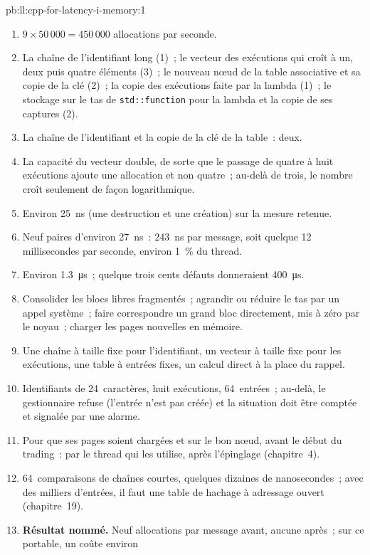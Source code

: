 \begin{solution}{pb:ll:cpp-for-latency-i-memory:1}
\begin{enumerate}
\item $9 \times 50\,000 = 450\,000$ allocations par seconde.
\item La chaîne de l'identifiant long (1)~; le vecteur des exécutions qui croît à un, deux puis quatre éléments (3)~; le nouveau nœud de la table associative
et sa copie de la clé (2)~; la copie des exécutions faite par la lambda (1)~; le stockage sur le tas de \texttt{std::function} pour la lambda et
la copie de ses captures (2).
\item La chaîne de l'identifiant et la copie de la clé de la table~: deux.
\item La capacité du vecteur double, de sorte que le passage de quatre à huit exécutions ajoute une allocation et non quatre~; au-delà de trois, le nombre croît
seulement de façon logarithmique.
\item Environ \qty{25}{\nano\second} (une destruction et une création) sur la mesure retenue.
\item Neuf paires d'environ \qty{27}{\nano\second}~: \qty{243}{\nano\second} par message, soit quelque 12 millisecondes par seconde, environ
1~\% du thread.
\item Environ \qty{1.3}{\micro\second}~; quelque trois cents défauts donneraient \qty{400}{\micro\second}.
\item Consolider les blocs libres fragmentés~; agrandir ou réduire le tas par un appel système~; faire correspondre un grand bloc
directement, mis à zéro par le noyau~; charger les pages nouvelles en mémoire.
\item Une chaîne à taille fixe pour l'identifiant, un vecteur à taille fixe pour les exécutions, une table à entrées fixes, un calcul direct
à la place du rappel.
\item Identifiants de 24~caractères, huit exécutions, 64~entrées~; au-delà, le gestionnaire refuse (l'entrée n'est pas créée)
et la situation doit être comptée et signalée par une alarme.
\item Pour que ses pages soient chargées et sur le bon nœud, avant le début du trading~: par le thread qui les utilise, après
l'épinglage (chapitre~4).
\item 64~comparaisons de chaînes courtes, quelques dizaines de nanosecondes~; avec des milliers d'entrées, il faut une table
de hachage à adressage ouvert (chapitre~19).
\item \textbf{Résultat nommé.} Neuf allocations par message avant, aucune après~; sur ce portable, un  coûte environ

\end{enumerate}
\end{solution}
